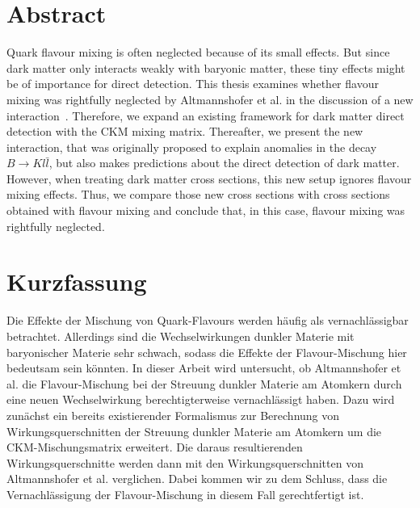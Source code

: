 \thispagestyle{plain}
\section*{Abstract}
Quark flavour mixing is often neglected because of its small effects. But since dark matter only interacts weakly with baryonic matter, these tiny effects might be of importance for direct detection. This thesis examines whether flavour mixing was rightfully neglected by Altmannshofer et al. in the discussion of a new \mbox{interaction \cite{Z}}. Therefore, we expand an existing framework for dark matter direct detection with the CKM mixing matrix. Thereafter, we present the new interaction, that was originally proposed to explain anomalies in the decay $B\rightarrow Kl\bar{l}$, but also makes predictions about the direct detection of dark matter. However, when treating dark matter cross sections, this new setup ignores flavour mixing effects. Thus, we compare those new cross sections with cross sections obtained with flavour mixing and conclude that, in this case, flavour mixing was rightfully neglected.


\section*{Kurzfassung}
Die Effekte der Mischung von Quark-Flavours werden häufig als vernachlässigbar betrachtet. Aller\-dings sind die Wechselwirkungen dunkler Materie mit baryonischer Materie sehr schwach, sodass die Effekte der Flavour-Mischung hier bedeutsam sein könn\-ten. In dieser Arbeit wird untersucht, ob Altmannshofer et al. die Flavour-Mischung bei der Streuung dunkler Materie am Atomkern durch eine neuen Wechselwirkung \cite{Z} berechtigterweise vernachlässigt haben. Dazu wird zunächst ein bereits existierender Formalismus zur Berechnung von Wirkungsquerschnitten der Streuung dunkler Materie am Atomkern um die CKM-Mischungsmatrix erweitert. Die daraus resultierenden Wirkungsquerschnitte werden dann mit den Wirkungsquerschnitten von Altmannshofer et al. verglichen. Dabei kommen wir zu dem Schluss, dass die Vernachlässigung der Flavour-Mischung in diesem Fall gerechtfertigt ist.